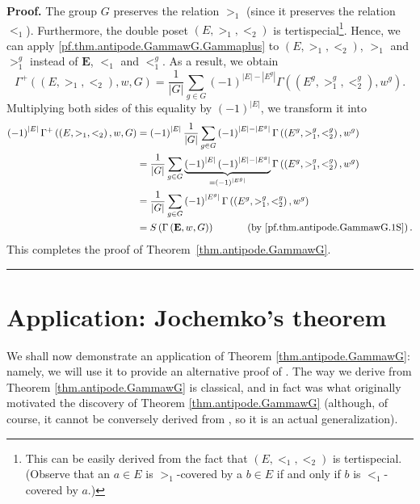 \documentclass[numbers=enddot,12pt,final,onecolumn,notitlepage,abstracton]{scrartcl}%
\theoremstyle{definition}
\newenvironment{proof}[1][Proof]{\noindent\textbf{#1.} }{\ \rule{0.5em}{0.5em}}
\let\sumnonlimits\sum
\renewcommand{\sum}{\sumnonlimits\limits}
\newcommand{\EE}{{\mathbf{E}}}
\begin{document}
\begin{proof}
The group $G$ preserves the relation $>_1$ (since it preserves the
relation $<_1$).
Furthermore, the double poset $\left( E, >_1, <_2 \right)$ is
tertispecial\footnote{This can be easily derived from the fact
that $\left( E, <_1, <_2 \right)$ is tertispecial. (Observe that
an $a \in E$ is $>_1$-covered by a $b \in E$ if and only if $b$
is $<_1$-covered by $a$.)}.
Hence, we can apply
\eqref{pf.thm.antipode.GammawG.Gammaplus}
to $\left(  E,>_{1},<_{2}\right)  $, $>_1$ and $>_1^g$
instead of $\EE$, $<_1$ and $<_1^g$. As a result, we obtain
\[
\Gamma^{+}\left(  \left(  E,>_{1},<_{2}\right)  ,w,G\right)  =\dfrac
{1}{\left\vert G\right\vert }\sum_{g\in G}\left(  -1\right)  ^{\left\vert
E\right\vert -\left\vert E^{g}\right\vert }\Gamma\left(  \left(  E^{g}%
,>_{1}^{g},<_{2}^{g}\right)  ,w^{g}\right)  .
\]
Multiplying both sides of this equality by $\left(  -1\right)  ^{\left\vert
E\right\vert }$, we transform it into
\begin{align*}
\left(  -1\right)  ^{\left\vert E\right\vert }\Gamma^{+}\left(  \left(
E,>_{1},<_{2}\right)  ,w,G\right)
& = \left(  -1\right)  ^{\left\vert E\right\vert}
\dfrac{1}{\left\vert G\right\vert }\sum_{g\in G}
\left(  -1\right)  ^{\left\vert E\right\vert -\left\vert E^{g}\right\vert }%
\Gamma\left(  \left(
E^{g},>_{1}^{g},<_{2}^{g}\right)  ,w^{g}\right)  \\
& =\dfrac{1}{\left\vert G\right\vert
}\sum_{g\in G}\underbrace{\left(  -1\right)  ^{\left\vert E\right\vert
}\left(  -1\right)  ^{\left\vert E\right\vert -\left\vert E^{g}\right\vert }%
}_{=\left(  -1\right)  ^{\left\vert E^{g}\right\vert }}\Gamma\left(  \left(
E^{g},>_{1}^{g},<_{2}^{g}\right)  ,w^{g}\right)  \\
& =\dfrac{1}{\left\vert G\right\vert }\sum_{g\in G}\left(  -1\right)
^{\left\vert E^{g}\right\vert }\Gamma\left(  \left(  E^{g},>_{1}^{g},<_{2}%
^{g}\right)  ,w^{g}\right)  \\
& =S\left(  \Gamma\left(  { \EE },w,G\right)  \right)
\ \ \ \ \ \ \ \ \ \ 
\left(  \text{by \eqref{pf.thm.antipode.GammawG.1S}}\right)  .
\end{align*}
This completes the proof of Theorem~\ref{thm.antipode.GammawG}.
\end{proof}


\section{Application: Jochemko's theorem}
\label{sect.jochemko}

We shall now demonstrate an application of Theorem \ref{thm.antipode.GammawG}:
namely, we will use it to provide an alternative proof of \cite[Theorem
2.13]{Joch}. The way we derive \cite[Theorem 2.13]{Joch} from Theorem
\ref{thm.antipode.GammawG} is classical, and in fact was what originally
motivated the discovery of Theorem \ref{thm.antipode.GammawG} (although, of
course, it cannot be conversely derived from \cite[Theorem 2.13]{Joch}, so it
is an actual generalization).
\end{document}
